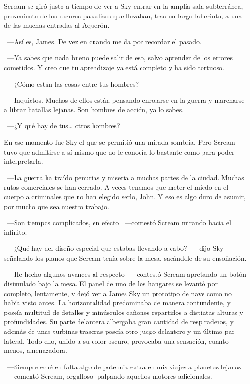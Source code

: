 Scream se giró justo a tiempo de ver a Sky entrar en la amplia sala subterránea, proveniente de los oscuros pasadizos que llevaban, tras un largo laberinto, a una de las muchas entradas al Aquerón.

~---Así es, James. De vez en cuando me da por recordar el pasado.

~---Ya sabes que nada bueno puede salir de eso, salvo aprender de los errores cometidos. Y creo que tu aprendizaje ya está completo y ha sido tortuoso.

~---¿Cómo están las cosas entre tus hombres?

~---Inquietos. Muchos de ellos están pensando enrolarse en la guerra y marcharse a librar batallas lejanas. Son hombres de acción, ya lo sabes.

~---¿Y qué hay de tus\dots{} otros hombres?

En ese momento fue Sky el que se permitió una mirada sombría. Pero Scream tuvo que admitirse a sí mismo que no le conocía lo bastante como para poder interpretarla.

~---La guerra ha traído penurias y miseria a muchas partes de la ciudad. Muchas rutas comerciales se han cerrado. A veces tenemos que meter el miedo en el cuerpo a criminales que no han elegido serlo, John. Y eso es algo duro de asumir, por mucho que sea nuestro trabajo.

~---Son tiempos complicados, en efecto ~---contestó Scream mirando hacia el infinito.

~---¿Qué hay del diseño especial que estabas llevando a cabo? ~---dijo Sky señalando los planos que Scream tenía sobre la mesa, sacándole de su ensoñación.

~---He hecho algunos avances al respecto ~---contestó Scream apretando un botón disimulado bajo la mesa. El panel de uno de los hangares se levantó por completo, lentamente, y dejó ver a James Sky un prototipo de nave como no había visto antes. La horizontalidad predominaba de manera contundente, y poseía multitud de detalles y minúsculos cañones repartidos a distintas alturas y profundidades. Su parte delantera albergaba gran cantidad de respiraderos, y además de unas turbinas traseras poseía otro juego delantero y un último par lateral. Todo ello, unido a su color oscuro, provocaba una sensación, cuanto menos, amenazadora.

~---Siempre eché en falta algo de potencia extra en mis viajes a planetas lejanos ~---comentó Scream, orgulloso, palpando aquellos motores adicionales.


